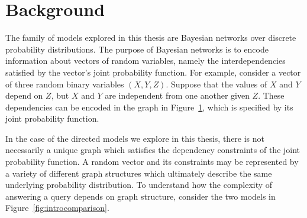 \section{Background}
\null \quad \quad The family of models explored in this thesis are Bayesian networks over discrete probability distributions. The purpose of Bayesian networks is to encode information about vectors of random variables, namely the interdependencies satisfied by the vector's joint probability function. For example, consider a vector of three random binary variables $(X,Y,Z)$. Suppose that the values of $X$ and $Y$ depend on $Z$, but $X$ and $Y$ are independent from one another given $Z$. These dependencies can be encoded in the graph in Figure~\ref{fig:simpleencoding}, which is specified by its joint probability function.\newline
\begin{figure}[h!]
\begin{center}
\end{center}
\caption{}
\label{fig:simpleencoding}
\end{figure}
\null \quad \quad In the case of the directed models we explore in this thesis, there is not necessarily a unique graph which satisfies the dependency constraints of the joint probability function. A random vector and its constraints may be represented by a variety of different graph structures which ultimately describe the same underlying probability distribution. To understand how the complexity of answering a query depends on graph structure, consider the two models in Figure~\ref{fig:introcomparison}.\newline
